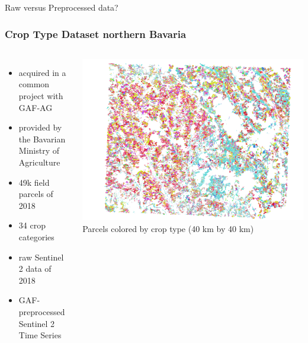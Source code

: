 
{
	\begin{frame}[plain]
	\vfill
	\begin{center}
		\Huge\color{tumwhite}
		Raw versus Preprocessed data?
	\end{center}
	\vfill
\end{frame}
}

\begin{frame}
	\frametitle{Crop Type Dataset northern Bavaria}
	
	\begin{columns}
		\begin{itemize}
			\item acquired in a common project with GAF-AG
			\item provided by the Bavarian Ministry of Agriculture
			\item 49k field parcels of 2018
			\item 34 crop categories
			\item raw Sentinel 2 data of 2018
			\item GAF-preprocessed Sentinel 2 Time Series
		\end{itemize}
		\includegraphics[width=\textwidth]{images/holl}
		\small
		Parcels colored by crop type (40 km by 40 km)
		
	\end{columns}
	
\end{frame}

